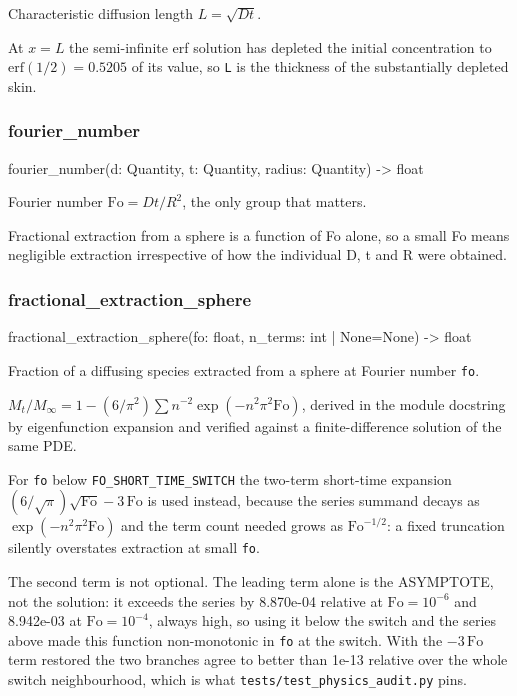 \documentclass[10pt,a4paper,twoside]{report}
\begin{document}
Characteristic diffusion length $L = \sqrt{D t}$.

At $x = L$ the semi-infinite erf solution has depleted the initial concentration to $\mathrm{erf}(1/2) = 0.5205$ of its value, so \texttt{L} is the thickness of the substantially depleted skin.

\subsubsection*{fourier\_number}

\begin{verbatimsmall}
fourier_number(d: Quantity, t: Quantity, radius: Quantity) -> float
\end{verbatimsmall}

Fourier number $\mathrm{Fo} = D t / R^2$, the only group that matters.

Fractional extraction from a sphere is a function of Fo alone, so a small Fo means negligible extraction irrespective of how the individual D, t and R were obtained.

\subsubsection*{fractional\_extraction\_sphere}

\begin{verbatimsmall}
fractional_extraction_sphere(fo: float, n_terms: int | None=None) -> float
\end{verbatimsmall}

Fraction of a diffusing species extracted from a sphere at Fourier number \texttt{fo}.

$M_t/M_\infty = 1 - (6/\pi^2)\sum n^{-2}\exp(-n^2\pi^2\mathrm{Fo})$, derived in the module docstring by eigenfunction expansion and verified against a finite-difference solution of the same PDE.

For \texttt{fo} below \texttt{FO\_SHORT\_TIME\_SWITCH} the two-term short-time expansion $(6/\sqrt{\pi})\sqrt{\mathrm{Fo}} - 3\,\mathrm{Fo}$ is used instead, because the series summand decays as $\exp(-n^2\pi^2\mathrm{Fo})$ and the term count needed grows as $\mathrm{Fo}^{-1/2}$: a fixed truncation silently overstates extraction at small \texttt{fo}.

The second term is not optional. The leading term alone is the ASYMPTOTE, not the solution: it exceeds the series by 8.870e-04 relative at $\mathrm{Fo} = 10^{-6}$ and 8.942e-03 at $\mathrm{Fo} = 10^{-4}$, always high, so using it below the switch and the series above made this function non-monotonic in \texttt{fo} at the switch. With the $-3\,\mathrm{Fo}$ term restored the two branches agree to better than 1e-13 relative over the whole switch neighbourhood, which is what \texttt{tests/test\_physics\_audit.py} pins.
\end{document}
